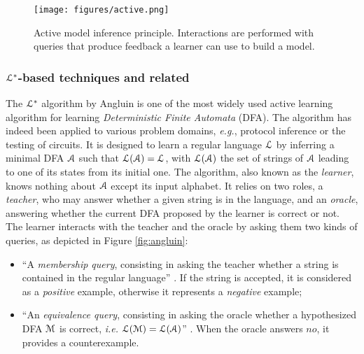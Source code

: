\begin{figure}[h]
    \begin{center}
        \texttt{[image: figures/active.png]}
    \end{center}

    \caption{Active model inference principle. Interactions are
        performed with queries that produce feedback a learner
        can use to build a model.}
    \label{fig:active}
\end{figure}

\subsubsection{$\EuScript{L}^*$-based techniques and related}
\label{sec:active-letoile}

The $\EuScript{L}^*$ algorithm by Angluin \cite{Angluin198787} is
one of the most widely used active learning algorithm for
learning \textit{Deterministic Finite Automata} (DFA). The
algorithm has indeed been applied to various problem domains,
\emph{e.g.}, protocol inference or the testing of circuits. It is
designed to learn a regular language $\EuScript{L}$ by inferring
a minimal DFA $\EuScript{A}$ such that
$\EuScript{L}(\EuScript{A})=\EuScript{L}$, with
$\EuScript{L}(\EuScript{A})$ the set of strings of $\EuScript{A}$
leading to one of its states from its initial one. The algorithm,
also known as the \textit{learner}, knows nothing about
$\EuScript{A}$ except its input alphabet. It relies on two roles,
a \textit{teacher}, who may answer whether a given string is in
the language, and an \textit{oracle}, answering whether the
current DFA proposed by the learner is correct or not. The
learner interacts with the teacher and the oracle by asking them
two kinds of queries, as depicted in Figure \ref{fig:angluin}:

\begin{itemize}
    \item \enquote{A \textit{membership query}, consisting in
    asking the teacher whether a string is contained in the
    regular language} \cite{berg2006regular}. If the string is
    accepted, it is considered as a \textit{positive} example,
    otherwise it represents a \textit{negative} example;

    \item \enquote{An \textit{equivalence query}, consisting in
    asking the oracle whether a hypothesized DFA $\EuScript{M}$
    is correct, \emph{i.e.} $\EuScript{L}(\EuScript{M}) =
    \EuScript{L}(\EuScript{A})$} \cite{berg2006regular}. When the
    oracle answers $no$, it provides a counterexample.
\end{itemize}

